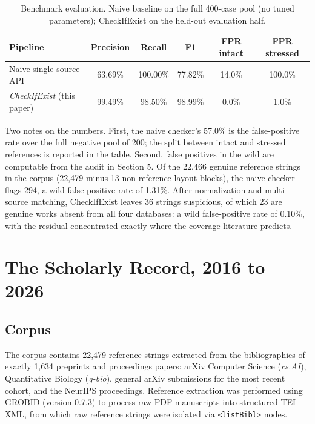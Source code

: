 \documentclass[11pt, a4paper]{article}
\begin{document}
\begin{table}[htbp]
\centering
\caption{Benchmark evaluation. Naive baseline on the full 400-case pool (no tuned parameters); CheckIfExist on the held-out evaluation half.}
\label{tab:benchmark}
\begin{tabular}{lccccc}
\toprule
\textbf{Pipeline} & \textbf{Precision} & \textbf{Recall} & \textbf{F1} & \textbf{FPR intact} & \textbf{FPR stressed} \\
\midrule
Naive single-source API & 63.69\% & 100.00\% & 77.82\% & 14.0\% & 100.0\% \\
\textit{CheckIfExist} (this paper) & 99.49\% & 98.50\% & 98.99\% & 0.0\% & 1.0\% \\
\bottomrule
\end{tabular}
\end{table}

Two notes on the numbers. First, the naive checker's 57.0\% is the false-positive rate over the full negative pool of 200; the split between intact and stressed references is reported in the table. Second, false positives in the wild are computable from the audit in Section 5. Of the 22{,}466 genuine reference strings in the corpus (22{,}479 minus 13 non-reference layout blocks), the naive checker flags 294, a wild false-positive rate of 1.31\%. After normalization and multi-source matching, CheckIfExist leaves 36 strings suspicious, of which 23 are genuine works absent from all four databases: a wild false-positive rate of 0.10\%, with the residual concentrated exactly where the coverage literature predicts.

\section{The Scholarly Record, 2016 to 2026}
\subsection{Corpus}
The corpus contains 22{,}479 reference strings extracted from the bibliographies of exactly 1{,}634 preprints and proceedings papers: arXiv Computer Science (\textit{cs.AI}), Quantitative Biology (\textit{q-bio}), general arXiv submissions for the most recent cohort, and the NeurIPS proceedings. Reference extraction was performed using GROBID (version 0.7.3) to process raw PDF manuscripts into structured TEI-XML, from which raw reference strings were isolated via \texttt{<listBibl>} nodes. 
\end{document}
